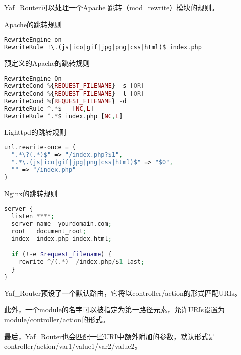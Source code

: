 Yaf\_Router可以处理一个Apache 跳转（mod\_rewrite）模块的规则。


\begin{example}
Apache的跳转规则
\begin{lstlisting}[language=PHP]
RewriteEngine on
RewriteRule !\.(js|ico|gif|jpg|png|css|html)$ index.php
\end{lstlisting}
\end{example}



\begin{example}
预定义的Apache的跳转规则
\begin{lstlisting}[language=PHP]
RewriteEngine On
RewriteCond %{REQUEST_FILENAME} -s [OR]
RewriteCond %{REQUEST_FILENAME} -l [OR]
RewriteCond %{REQUEST_FILENAME} -d
RewriteRule ^.*$ - [NC,L]
RewriteRule ^.*$ index.php [NC,L]
\end{lstlisting}
\end{example}

\begin{example}
Lighttpd的跳转规则
\begin{lstlisting}[language=PHP]
url.rewrite-once = (
  ".*\?(.*)$" => "/index.php?$1",
  ".*\.(js|ico|gif|jpg|png|css|html)$" => "$0",
  "" => "/index.php"
)
\end{lstlisting}
\end{example}


\begin{example}
Nginx的跳转规则
\begin{lstlisting}[language=PHP]
server {
  listen ****;
  server_name  yourdomain.com;
  root   document_root;
  index  index.php index.html;

  if (!-e $request_filename) {
    rewrite ^/(.*)  /index.php/$1 last;
  }
}
\end{lstlisting}
\end{example}


Yaf\_Router预设了一个默认路由，它将以controller/action的形式匹配URIs。

此外，一个module的名字可以被指定为第一路径元素，允许URIs设置为module/controller/action的形式。

最后，Yaf\_Router也会匹配一些URI中额外附加的参数，默认形式是controller/action/var1/value1/var2/value2。


